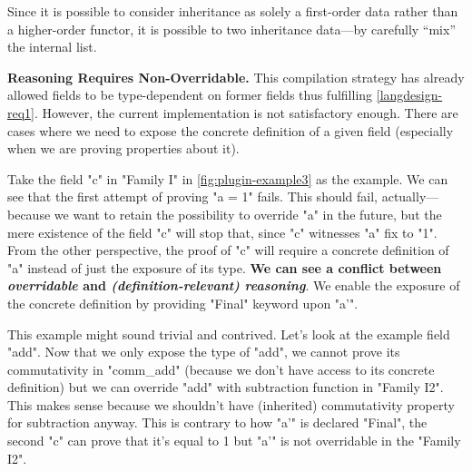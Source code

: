 Since it is possible to consider inheritance as solely a first-order data rather
than a higher-order functor, it is possible to
 two inheritance data---by carefully ``mix'' the internal list.





\textbf{Reasoning Requires Non-Overridable.}
This compilation strategy
has already allowed fields to be type-dependent on former fields thus fulfilling
\ref{langdesign-req1}. However, the current implementation is not satisfactory enough. There are cases where we need to expose
the concrete definition of a given field (especially when we are proving
properties about it).

Take the field "c" in "Family I" in \cref{fig:plugin-example3} as the
example. We can see that the first attempt of proving "a = 1" fails.
This should fail, actually---because we want to retain the possibility
to override "a" in the future, but the mere existence of the field "c"
will stop that, since "c" witnesses "a" fix to "1". From the other
perspective, the proof of "c" will require a concrete definition of "a"
instead of just the exposure of its type. \textbf{We can see a conflict
between \textit{overridable} and \textit{(definition-relevant)
reasoning}}.  We enable the exposure of the concrete definition by
providing "Final" keyword upon "a'".

This example might sound trivial and contrived. Let's look at the
example field "add". Now that we only expose the type of "add", we
cannot prove its commutativity in "comm_add" (because we don't have
access to its concrete definition) but we can override "add" with
subtraction function in "Family I2". This makes sense because we
shouldn't have (inherited) commutativity property for subtraction
anyway. This is contrary to how "a'" is declared "Final", the second "c"
can prove that it's equal to 1 but "a'" is not overridable in the
"Family I2".

